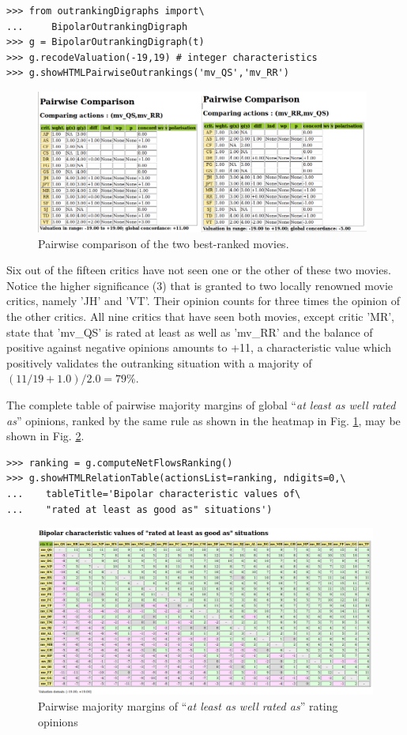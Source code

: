\begin{lstlisting}
>>> from outrankingDigraphs import\
...     BipolarOutrankingDigraph
>>> g = BipolarOutrankingDigraph(t)
>>> g.recodeValuation(-19,19) # integer characteristics
>>> g.showHTMLPairwiseOutrankings('mv_QS','mv_RR')
\end{lstlisting}
\begin{figure}[h]
\includegraphics[width=11cm]{Figures/graffiti07_45.png}
\caption{Pairwise comparison of the two best-ranked movies.}
\label{fig:16.3}       %
\end{figure}

Six out of the fifteen critics have not seen one or the other of these two movies. Notice the higher significance (3) that is granted to two locally renowned movie critics, namely 'JH' and 'VT'. Their opinion counts for three times the opinion of the other critics. All nine critics that have seen both movies, except critic 'MR', state that 'mv\_QS' is rated at least as well as 'mv\_RR' and the balance of positive against negative opinions amounts to +11, a characteristic value which positively validates the outranking situation with a majority of $(11/19 + 1.0) / 2.0 = 79\%$.

The complete table of pairwise majority margins of global ``\emph{at least as well rated as}'' opinions, ranked by the same rule as shown in the heatmap in Fig. \ref{fig:16.3}, may be shown in Fig. \ref{fig:16.4}. 

\begin{lstlisting}      
>>> ranking = g.computeNetFlowsRanking()
>>> g.showHTMLRelationTable(actionsList=ranking, ndigits=0,\
...    tableTitle='Bipolar characteristic values of\
...    "rated at least as good as" situations')
\end{lstlisting}
\begin{figure}[h]
\includegraphics[width=12cm]{Figures/graffiti07_3.png}
\caption{Pairwise majority margins of ``\emph{at least as well rated as}'' rating opinions}
\label{fig:16.4}       %
\end{figure}

